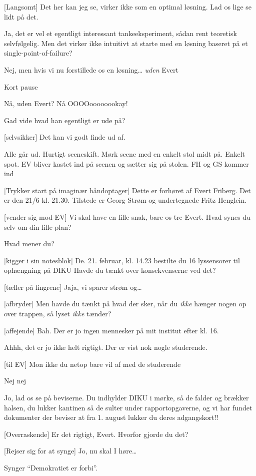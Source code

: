 \documentclass[a4paper,11pt]{article}
\begin{document}
\begin{sketch}
{    [Langsomt] Det her kan jeg se, virker ikke som en optimal
    løsning. Lad os lige se lidt på det.
    
     Ja, det er vel et egentligt interessant
    tankeeksperiment, sådan rent teoretisk selvfølgelig.
     Men det virker ikke intuitivt at starte med en
    løsning baseret på et single-point-of-failure?
    
     Nej, men hvis vi nu forstillede os en løsning\ldots
    \emph{uden} Evert
    
    \scene Kort pause
    
    Nå, uden Evert? Nå OOOOoooooookay!
    
     Gad vide hvad han egentligt er ude på?
    
    [selvsikker] Det kan vi godt finde ud af.
    
    \scene Alle går ud. Hurtigt sceneskift. Mørk scene med en enkelt stol midt
    på. 
    Enkelt spot. EV bliver kastet ind på scenen og sætter sig på
    stolen. FH og GS kommer ind}
  
  [Trykker start på imaginær båndoptager] Dette er forhøret
  af Evert Friberg. Det er den 21/6 kl. 21.30. Tilstede er Georg Strøm
  og undertegnede Fritz Henglein.
  
  [vender sig mod EV] Vi skal have en lille snak, bare os tre
  Evert. Hvad synes du selv om din lille plan?
  
   Hvad mener du?
  
  [kigger i sin notesblok] De. 21. februar, kl. 14.23
  bestilte du 16 lyssensorer til ophængning på DIKU 
  Havde du tænkt over konsekvenserne ved det?
  
  [tæller på fingrene] Jaja, vi sparer strøm og\ldots
  
  [afbryder] Men havde du tænkt på hvad der sker, når du
  \emph{ikke} hænger nogen op over trappen, så lyset \emph{ikke}
  tænder?
  
  [affejende] Bah. Der er jo ingen mennesker på mit institut
  efter kl. 16.
  
   Ahhh, det er jo ikke helt rigtigt. Der er vist nok nogle
  studerende.
  
  [til EV] Mon ikke du netop bare vil af med de studerende
  
   Nej nej
  
   Jo, lad os se på beviserne.  Du
  indhylder DIKU i mørke, så de falder og brækker halsen, du lukker kantinen
  så de sulter under rapportopgaverne, 
   og vi har fundet dokumenter der beviser at fra 1.
  august lukker du deres adgangskort!!
  
  
  [Overraskende] Er det rigtigt, Evert. Hvorfor gjorde du det?

  [Rejser sig for at synge] Jo, nu skal I høre\ldots

  \scene Synger ``Demokratiet er forbi''.

\end{sketch}
\end{document}
